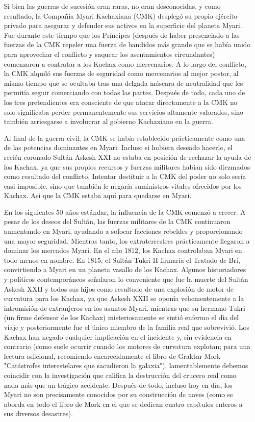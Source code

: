 \documentclass[spanish,12pt,a4paper,oneside,titlepage, twocolumn]{article}
\begin{document}
    Si bien las guerras de sucesión eran raras, no eran desconocidas, y como resultado, la Compañía Myari Kachaxiana (CMK) desplegó su propio ejército privado para asegurar y defender sus activos en la superficie del planeta Myari. Fue durante este tiempo que los Príncipes (después de haber presenciado a las fuerzas de la CMK repeler una fuerza de bandidos más grande que se había unido para aprovechar el conflicto y saquear los asentamientos circundantes) comenzaron a contratar a los Kachax como mercenarios. A lo largo del conflicto, la CMK alquiló sus fuerzas de seguridad como mercenarios al mejor postor, al mismo tiempo que se ocultaba tras una delgada máscara de neutralidad que les permitía seguir comerciando con todas las partes. Después de todo, cada uno de los tres pretendientes era consciente de que atacar directamente a la CMK no solo significaba perder permanentemente sus servicios altamente valorados, sino también arriesgarse a involucrar al gobierno Kachaxiano en la guerra.

    Al final de la guerra civil, la CMK se había establecido prácticamente como una de las potencias dominantes en Myari. Incluso si hubiera deseado hacerlo, el recién coronado Sultán Askesh XXI no estaba en posición de rechazar la ayuda de los Kachax, ya que sus propios recursos y fuerzas militares habían sido diezmados como resultado del conflicto. Intentar destituir a la CMK del poder no solo sería casi imposible, sino que también le negaría suministros vitales ofrecidos por los Kachax. Así que la CMK estaba aquí para quedarse en Myari.

    En los siguientes 50 años estándar, la influencia de la CMK comenzó a crecer. A pesar de los deseos del Sultán, las fuerzas militares de la CMK continuaron aumentando en Myari, ayudando a sofocar facciones rebeldes y proporcionando una mayor seguridad. Mientras tanto, los extraterrestres prácticamente llegaron a dominar los mercados Myari. En el año 1812, los Kachax controlaban Myari en todo menos en nombre. En 1815, el Sultán Tukri II firmaría el Tratado de Bri, convirtiendo a Myari en un planeta vasallo de los Kachax. Algunos historiadores y políticos contemporáneos señalaron lo conveniente que fue la muerte del Sultán Askesh XXII y todos sus hijos como resultado de una explosión de motor de curvatura para los Kachax, ya que Askesh XXII se oponía vehementemente a la intromisión de extranjeros en los asuntos Myari, mientras que su hermano Tukri (un firme defensor de los Kachax) misteriosamente se sintió enfermo el día del viaje y posteriormente fue el único miembro de la familia real que sobrevivió. Los Kachax han negado cualquier implicación en el incidente y, sin evidencia en contrario (como suele ocurrir cuando los motores de curvatura explotan; para una lectura adicional, recomiendo encarecidamente el libro de Graktar Mork "Catástrofes interestelares que sacudieron la galaxia"), lamentablemente debemos coincidir con la investigación que califica la destrucción del crucero real como nada más que un trágico accidente. Después de todo, incluso hoy en día, los Myari no son precisamente conocidos por su construcción de naves (como se aborda en todo el libro de Mork en el que se dedican cuatro capítulos enteros a sus diversos desastres).
\end{document}

